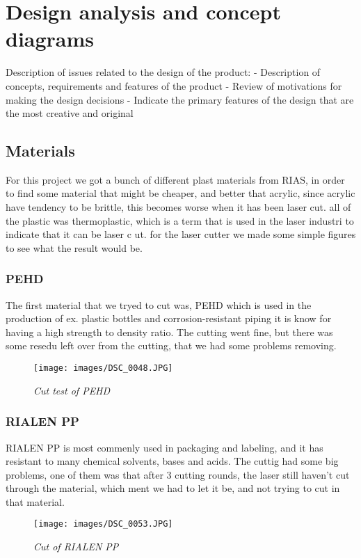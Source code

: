 \section{Design analysis and concept diagrams}
Description of issues related to the design of the product:
- Description of concepts, requirements and features of the product
- Review of motivations for making the design decisions
- Indicate the primary features of the design that are the most creative and original

\subsection{Materials}
For this project we got a bunch of different plast materials from RIAS, in order to find some material that might be cheaper, and better that acrylic, since acrylic have tendency to be brittle, this becomes worse when it has been laser cut.
all of the plastic was thermoplastic, which is a term that is used in the laser industri to indicate that it can be laser c ut.
for the laser cutter we made some simple figures to see what the result would be.
\subsubsection{PEHD}
The first material that we tryed to cut was, PEHD which is used in the production of ex. plastic bottles and corrosion-resistant piping it is know for having a high strength to density ratio.
The cutting went fine, but there was some resedu left over from the cutting, that we had some problems removing.
\begin{figure}[h]
	\begin{center}
		\texttt{[image: images/DSC\_0048.JPG]}
		\caption{\small {\it {Cut test of PEHD}}} \label{fig:explode}
	\end{center}
\end{figure}
\subsubsection{RIALEN PP}
RIALEN PP  is most commenly used in packaging and labeling, and it has resistant to many chemical solvents, bases and acids.
The cuttig had some big problems, one of them was that after 3 cutting rounds, the laser still haven't cut through the material, which ment we had to let it be, and not trying to cut in that material. 
\begin{figure}[h]
	\begin{center}
		\texttt{[image: images/DSC\_0053.JPG]}
		\caption{\small {\it {Cut of RIALEN PP}}} \label{fig:explode}
	\end{center}
\end{figure}

